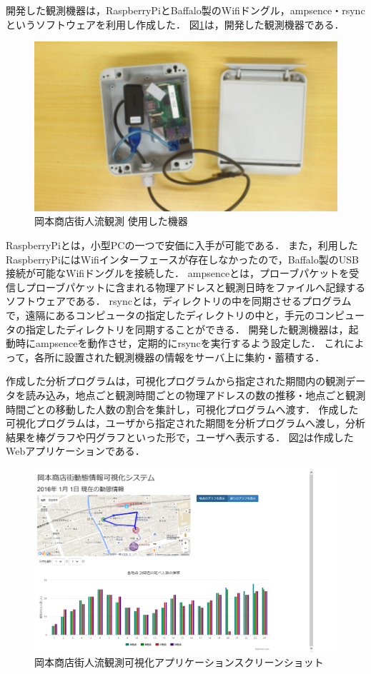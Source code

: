 開発した観測機器は，RaspberryPiとBaffalo製のWifiドングル，ampsence・rsyncというソフトウェアを利用し作成した．
図\ref{fig:okamoto_pict1}は，開発した観測機器である．
\begin{figure}[htbp]
\includegraphics[width=16cm]{images/okamoto_pict1.png}
\caption{岡本商店街人流観測 使用した機器}
\label{fig:okamoto_pict1}
\end{figure}
RaspberryPiとは，小型PCの一つで安価に入手が可能である．
また，利用したRaspberryPiにはWifiインターフェースが存在しなかったので，Baffalo製のUSB接続が可能なWifiドングルを接続した．
ampsenceとは，プローブパケットを受信しプローブパケットに含まれる物理アドレスと観測日時をファイルへ記録するソフトウェアである．
rsyncとは，ディレクトリの中を同期させるプログラムで，遠隔にあるコンピュータの指定したディレクトリの中と，手元のコンピュータの指定したディレクトリを同期することができる．
開発した観測機器は，起動時にampsenceを動作させ，定期的にrsyncを実行するよう設定した．
これによって，各所に設置された観測機器の情報をサーバ上に集約・蓄積する．

作成した分析プログラムは，可視化プログラムから指定された期間内の観測データを読み込み，地点ごと観測時間ごとの物理アドレスの数の推移・地点ごと観測時間ごとの移動した人数の割合を集計し，可視化プログラムへ渡す．
作成した可視化プログラムは，ユーザから指定された期間を分析プログラムへ渡し，分析結果を棒グラフや円グラフといった形で，ユーザへ表示する．
図\ref{fig:okamoto_ss}は作成したWebアプリケーションである．
\begin{figure}[htbp]
\includegraphics[width=16cm]{images/okamoto_scr1.png}
\caption{岡本商店街人流観測可視化アプリケーションスクリーンショット}
\label{fig:okamoto_ss}
\end{figure}

